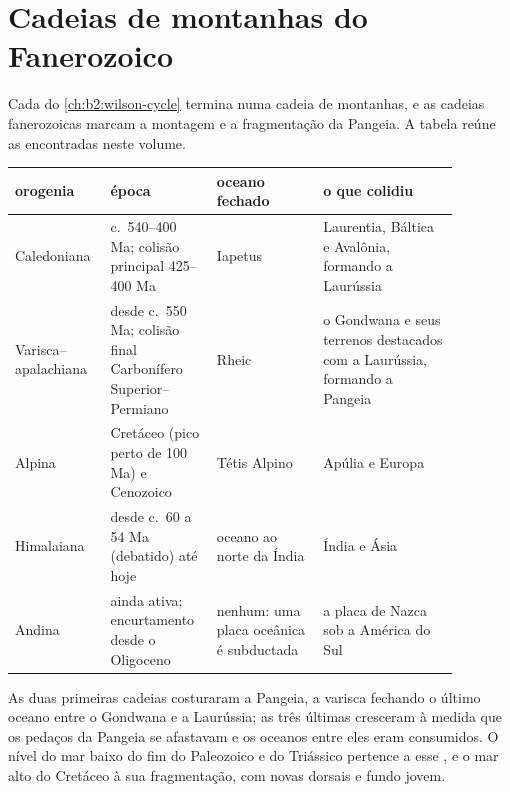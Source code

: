 \section{Cadeias de montanhas do Fanerozoico}\label{sec:b2:phanerozoic-earth:orogens}

Cada  do \cref{ch:b2:wilson-cycle} termina numa cadeia de montanhas, e as cadeias
fanerozoicas marcam a montagem e a fragmentação da Pangeia. A tabela reúne as encontradas neste volume.

\begin{center}
\small
\begin{tabular}{>{\raggedright\arraybackslash}p{0.15\linewidth}>{\raggedright\arraybackslash}p{0.22\linewidth}>{\raggedright\arraybackslash}p{0.22\linewidth}>{\raggedright\arraybackslash}p{0.29\linewidth}}
\hline
orogenia & época & oceano fechado & o que colidiu \\
\hline
Caledoniana & c.~540--400 Ma; colisão principal 425--400 Ma & Iapetus & Laurentia, Báltica e
Avalônia, formando a Laurússia \\
Varisca--apalachiana & desde c.~550 Ma; colisão final Carbonífero Superior--Permiano & Rheic &
o Gondwana e seus terrenos destacados com a Laurússia, formando a Pangeia \\
Alpina & Cretáceo (pico perto de 100 Ma) e Cenozoico & Tétis Alpino & Apúlia e Europa \\
Himalaiana & desde c.~60 a 54 Ma (debatido) até hoje & oceano ao norte da Índia & Índia e Ásia \\
Andina & ainda ativa; encurtamento desde o Oligoceno & nenhum: uma placa oceânica é subductada & a
placa de Nazca sob a América do Sul \\
\hline
\end{tabular}
\end{center}

As duas primeiras cadeias costuraram a Pangeia, a varisca fechando o último oceano entre o Gondwana
e a Laurússia; as três últimas cresceram à medida que os pedaços da Pangeia se afastavam e os oceanos entre
eles eram consumidos. O nível do mar baixo do fim do Paleozoico e do Triássico pertence a esse
, e o mar alto do Cretáceo à sua fragmentação, com novas dorsais e
fundo jovem.

